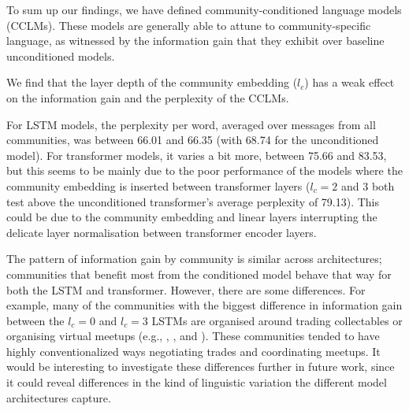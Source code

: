 \documentclass[11pt]{article}
\begin{document}
To sum up our findings, we have defined community-conditioned language
models (CCLMs). These models are generally able to attune to
community-specific language, as witnessed by the information gain that
they exhibit over baseline unconditioned models.

We find that the layer depth of the community embedding 
($l_c$) has a weak effect on the information gain and the
perplexity of the CCLMs.

For LSTM models, the perplexity per word, averaged over
messages from all communities, was between \num{66.01} and \num{66.35}
(with \num{68.74} for the unconditioned model).
For transformer models, it varies a bit more, between \num{75.66} and \num{83.53},
but this seems to be mainly due to the poor performance of the models where
the community embedding is inserted between transformer layers
($l_c=2$ and $3$ both test above the unconditioned transformer's 
average perplexity of \num{79.13}).
This could be due to the community embedding and linear layers
interrupting the delicate layer normalisation between transformer encoder layers.

The pattern of information gain by community is similar across
architectures;  communities that benefit most from the conditioned
model behave that way for both the LSTM and transformer.  However,
there are some differences.  For example, many of the communities with the biggest 
difference in information gain between the $l_c=0$ and $l_c=3$ LSTMs 
are organised around trading collectables or organising virtual meetups
(e.g.,
,
, and
).  
These communities tended to have highly conventionalized ways negotiating trades
and coordinating meetups.
It would be interesting to investigate these differences further in future work, since it
could reveal differences in the kind of linguistic variation the
different model architectures capture.


\end{document}
